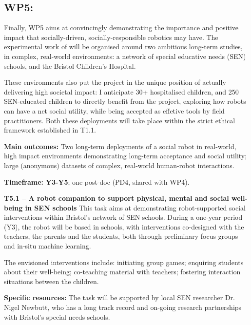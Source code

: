 \subsection{WP5: \textbf{\wpFive}}

Finally, WP5 aims at convincingly demonstrating the importance and positive
impact that socially-driven, socially-responsible robotics may have. The
experimental work of \project will be organised around two ambitious long-term
studies, in complex, real-world environments: a network of special educative
needs (SEN) schools, and the Bristol Children's Hospital.

These environments also put the project in the unique position of actually
delivering high societal impact: I anticipate 30+ hospitalised children, and 250
SEN-educated children to directly benefit from the project, exploring how robots
can have a net social utility, while being accepted as effetive tools by field
practitioners. Both these deployments will take place within the strict ethical
framework established in T1.1.

\begin{oframed}

    \textbf{Main outcomes:} Two long-term deployments of a social robot in
    real-world, high impact environments demonstrating long-term acceptance and
    social utility; large (anonymous) datasets of complex, real-world
    human-robot interactions.

    \textbf{Timeframe:} \textbf{Y3-Y5}; one post-doc (PD4, shared with WP4).

\end{oframed}

\textbf{T5.1 -- A robot companion to support physical, mental and social
well-being in SEN schools} This task aims at demonstrating robot-supported
social interventions within Bristol's network of SEN schools.  During a one-year
period (Y3), the robot will be based in schools, with interventions co-designed
with the teachers, the parents and the students, both through preliminary
focus groups and in-situ machine learning.

The envisioned interventions include: initiating group games; enquiring students
about their well-being; co-teaching material with teachers; fostering
interaction situations between the children.

\textbf{Specific resources:} The task will be supported by local SEN researcher
Dr. Nigel Newbutt, who has a long track record and on-going research
partnerships with Bristol's special needs schools.


